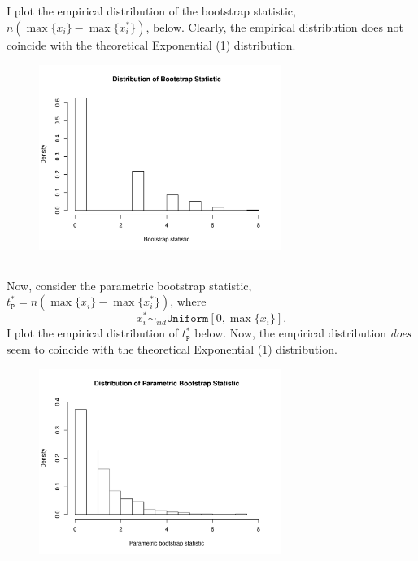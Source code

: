 \documentclass[12pt]{article}
\begin{document}
\subsection{}
I plot the empirical distribution of the bootstrap statistic, $n(\max\{x_i\} - \max\{x_i^*\})$, below. Clearly, the empirical distribution does not coincide with the theoretical Exponential (1) distribution.

\begin{figure}[!htpb]
    \centering
    
        \includegraphics[width=0.7\textwidth]{freq.pdf}

\end{figure}

\subsection{}
Now, consider the parametric bootstrap statistic, $t^*_{\texttt{P}}= n(\max\{x_i\} - \max\{x_i^*\})$, where $$x_i^* \sim_{iid} \texttt{Uniform}[0,\max\{x_i\}].$$ I plot the empirical distribution of $t^*_{\texttt{P}}$ below. Now, the empirical distribution \textit{does} seem to coincide with the theoretical Exponential (1) distribution.

\begin{figure}[!htpb]
    \centering
    
        \includegraphics[width=0.7\textwidth]{freq2.pdf}

\end{figure}
\end{document}
